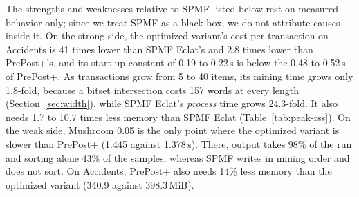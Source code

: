 The strengths and weaknesses relative to SPMF listed below rest on measured behavior
only; since we treat SPMF as a black box, we do not attribute causes inside it. On the
strong side, the optimized variant's cost per transaction on Accidents is 41 times lower
than SPMF Eclat's and 2.8 times lower than PrePost+'s, and its start-up constant of 0.19
to 0.22\,s is below the 0.48 to 0.52\,s of PrePost+. As transactions grow from 5 to 40
items, its mining time grows only 1.8-fold, because a bitset intersection costs 157 words
at every length (Section~\ref{sec:width}), while SPMF Eclat's \emph{process} time grows
24.3-fold. It also needs 1.7 to 10.7 times less memory than SPMF Eclat
(Table~\ref{tab:peak-rss}). On the weak side, Mushroom 0.05 is the only point where the
optimized variant is slower than PrePost+ (1.445 against 1.378\,s). There, output takes
98\% of the run and sorting alone 43\% of the samples, whereas SPMF writes in mining order
and does not sort. On Accidents, PrePost+ also needs 14\% less memory than the optimized
variant (340.9 against 398.3\,MiB).

